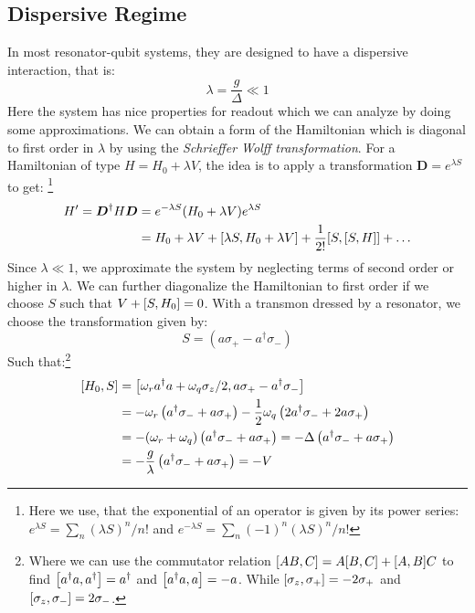 \subsection{Dispersive Regime}\label{sec:dispersive_regime}
In most resonator-qubit systems, they are designed to have a dispersive interaction, that is:
\begin{equation}
    \lambda = \frac{g}{\Delta} \ll 1
\end{equation}
Here the system has nice properties for readout which we can analyze by doing some approximations. We can obtain a form of the Hamiltonian which is diagonal to first order in $\lambda$ by using the \textit{Schrieffer Wolff transformation}. For a Hamiltonian of type $H = H_0 + \lambda V$, the idea is to apply a transformation $\boldsymbol{D} = e^{\lambda S}$ to get: \footnote{Here we use, that the exponential of an operator is given by its power series: $e^{\lambda S} = \sum_n (\lambda S)^n / n!$ and $e^{-\lambda  S} = \sum_n (-1)^n (\lambda S)^n / n!$}
\begin{align*}
    H' = \boldsymbol{D}^\dagger H \boldsymbol{D} &= e^{-\lambda S} (H_0 + \lambda V) e^{\lambda  S} \\
    &= H_0 + \lambda V + \comm{\lambda S}{H_0 + \lambda V} + \frac{1}{2!} \comm{S}{\comm{S}{H}} + \dots
\end{align*}
Since $\lambda \ll 1$, we approximate the system by neglecting terms of second order or higher in $\lambda$. We can further diagonalize the Hamiltonian to first order if we choose $S$ such that $V + \comm{S}{H_0} = 0$. With a transmon dressed by a resonator, we choose the transformation given by:
\begin{equation}
    S = (a \sigma_+ - a^\dagger \sigma_-)
\end{equation}
Such that:\footnote{Where we can use the commutator relation $\comm{AB}{C} = A\comm{B}{C} + \comm{A}{B}C$ to find $\comm{a^\dagger a}{a^\dagger} = a^\dagger$ and $\comm{a^\dagger a}{a} = - a$. While $\comm{\sigma_z}{\sigma_+} = -2\sigma_+$ and $\comm{\sigma_z}{\sigma_-} = 2\sigma_-$.}
\begin{align*}
    \comm{H_0}{S} &= \comm{\omega_r a^\dagger a + \omega_q \sigma_z / 2}{a \sigma_+ - a^\dagger \sigma_-} \\
    &= - \omega_r \left(a^\dagger \sigma_- + a \sigma_+\right) - \frac12 \omega_q \left(2a^\dagger \sigma_- + 2 a \sigma_+ \right) \\
    &= -  (\omega_r + \omega_q)\left(a^\dagger \sigma_- + a \sigma_+\right) = - \Delta \left(a^\dagger \sigma_- + a \sigma_+\right) \\
    &= - \frac{g}{\lambda} \left(a^\dagger \sigma_- + a \sigma_+\right) = - V 
\end{align*}
